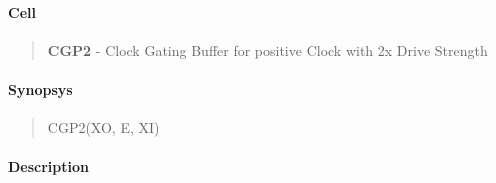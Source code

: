 \label{CGP2}
\paragraph{Cell}
\begin{quote}
    \textbf{CGP2} - Clock Gating Buffer for positive Clock with 2x Drive Strength
\end{quote}

\paragraph{Synopsys}
\begin{quote}
    CGP2(XO, E, XI)
\end{quote}

\paragraph{Description}

%

%

